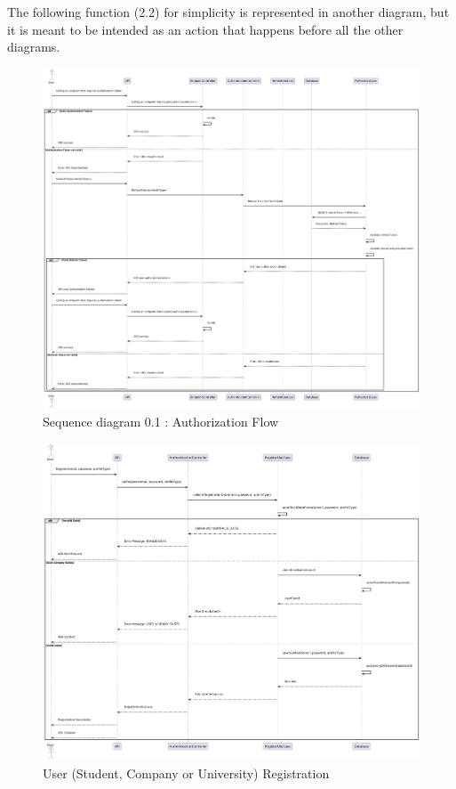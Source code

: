 The following function (2.2) for simplicity is represented in another diagram, but it is meant to be intended as an action that happens before all the other diagrams.
\vspace{5mm}

\begin{figure}[ht!]
    \includegraphics[scale=0.29]{Images/ImagesSequenceDiagram/AuthSequenceFlow.png}
    \caption{Sequence diagram 0.1 : Authorization Flow}
\end{figure}

\begin{figure}[ht!]
    \includegraphics[scale=0.29]{Images/ImagesSequenceDiagram/RegisterAuthentication.png}
    \caption{User (Student, Company or University) Registration}
\end{figure}


